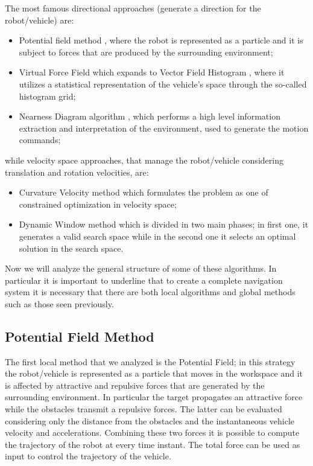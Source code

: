 The most famous directional approaches (generate a direction for the robot/vehicle) are:
\begin{itemize}
	\item Potential field method \cite{Khatib1986}, where the robot is represented as a particle and it is subject to forces that are produced by the surrounding environment;
	\item Virtual Force Field which expands to Vector Field Histogram \cite{Borenstein1991}, where it utilizes a statistical representation of the vehicle's space through the so-called histogram grid;
	\item Nearness Diagram algorithm \cite{Montano2000}, which  performs a high level information extraction and interpretation of the environment, used to generate the motion commands;
\end{itemize}
while velocity space approaches, that manage the robot/vehicle considering translation and rotation velocities, are:
\begin{itemize}
	\item Curvature Velocity method \cite{Simmons1996} which formulates the problem as one of constrained optimization in velocity space;
	\item Dynamic Window method \cite{Fox1997} which is divided in two main phases; in first one, it generates a valid search space while in the second one it selects an optimal solution in the search space.
\end{itemize}
Now we will analyze the general structure of some of these algorithms. In particular it is important to underline that to create a complete navigation system it is necessary that there are both local algorithms and global methods such as those seen previously.

\subsection{Potential Field Method}
The first local method that we analyzed is the Potential Field; in this strategy the robot/vehicle is represented as a particle that moves in the workspace and it is affected by attractive and repulsive forces that are generated by the surrounding environment. In particular the target propagates an attractive force while the obstacles transmit a repulsive forces. The latter can be evaluated considering only the distance from the obstacles and the instantaneous vehicle velocity and accelerations. Combining these two forces it is possible to compute the trajectory of the robot at every time instant. The total force can be used as input to control the trajectory of the vehicle.
